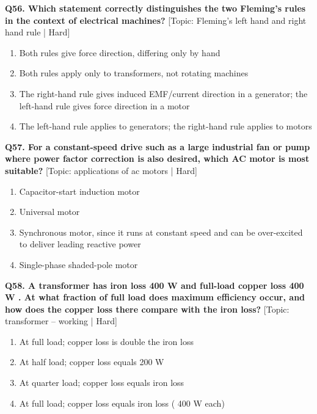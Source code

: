 \noindent\textbf{Q56. Which statement correctly distinguishes the two Fleming's rules in the context of electrical machines?} \hfill [Topic: Fleming's left hand and right hand rule | Hard]
\begin{enumerate}[label=(\alph*),topsep=2pt,itemsep=1pt,partopsep=0pt,parsep=0pt]
    \item {Both rules give force direction, differing only by hand}
    \item {Both rules apply only to transformers, not rotating machines}
    \item {The right-hand rule gives induced EMF/current direction in a generator; the left-hand rule gives force direction in a motor}
    \item {The left-hand rule applies to generators; the right-hand rule applies to motors}
\end{enumerate}
\vspace{2mm}

\noindent\textbf{Q57. For a constant-speed drive such as a large industrial fan or pump where power factor correction is also desired, which AC motor is most suitable?} \hfill [Topic: applications of ac motors | Hard]
\begin{enumerate}[label=(\alph*),topsep=2pt,itemsep=1pt,partopsep=0pt,parsep=0pt]
    \item {Capacitor-start induction motor}
    \item {Universal motor}
    \item {Synchronous motor, since it runs at constant speed and can be over-excited to deliver leading reactive power}
    \item {Single-phase shaded-pole motor}
\end{enumerate}
\vspace{2mm}

\noindent\textbf{Q58. A transformer has iron loss 400 W and full-load copper loss 400 W . At what fraction of full load does maximum efficiency occur, and how does the copper loss there compare with the iron loss?} \hfill [Topic: transformer -- working | Hard]
\begin{enumerate}[label=(\alph*),topsep=2pt,itemsep=1pt,partopsep=0pt,parsep=0pt]
    \item {At full load; copper loss is double the iron loss}
    \item {At half load; copper loss equals 200 W}
    \item {At quarter load; copper loss equals iron loss}
    \item {At full load; copper loss equals iron loss ( 400 W each)}
\end{enumerate}
\vspace{2mm}

